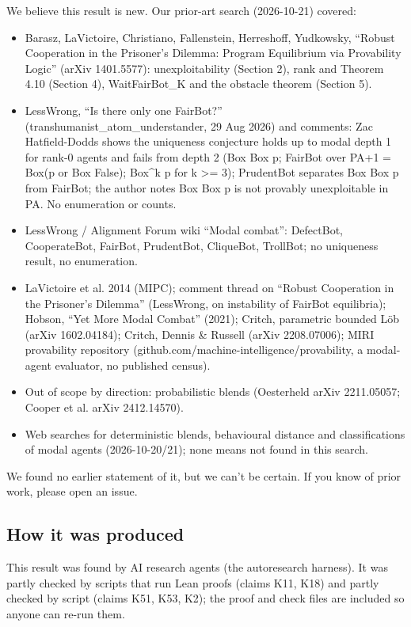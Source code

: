 \documentclass{article}
\begin{document}
We believe this result is new. Our prior-art search (2026-10-21) covered:

\begin{itemize}
\item Barasz, LaVictoire, Christiano, Fallenstein, Herreshoff, Yudkowsky, ``Robust Cooperation in the Prisoner's Dilemma: Program Equilibrium via Provability Logic'' (arXiv 1401.5577): unexploitability (Section 2), rank and Theorem 4.10 (Section 4), WaitFairBot\_K and the obstacle theorem (Section 5).
\item LessWrong, ``Is there only one FairBot?'' (transhumanist\_atom\_understander, 29 Aug 2026) and comments: Zac Hatfield-Dodds shows the uniqueness conjecture holds up to modal depth 1 for rank-0 agents and fails from depth 2 (Box Box p; FairBot over PA+1 = Box(p or Box False); Box\textasciicircum{}k p for k \textgreater{}= 3); PrudentBot separates Box Box p from FairBot; the author notes Box Box p is not provably unexploitable in PA. No enumeration or counts.
\item LessWrong / Alignment Forum wiki ``Modal combat'': DefectBot, CooperateBot, FairBot, PrudentBot, CliqueBot, TrollBot; no uniqueness result, no enumeration.
\item LaVictoire et al. 2014 (MIPC); comment thread on ``Robust Cooperation in the Prisoner's Dilemma'' (LessWrong, on instability of FairBot equilibria); Hobson, ``Yet More Modal Combat'' (2021); Critch, parametric bounded Löb (arXiv 1602.04184); Critch, Dennis \& Russell (arXiv 2208.07006); MIRI provability repository (github.com/machine-intelligence/provability, a modal-agent evaluator, no published census).
\item Out of scope by direction: probabilistic blends (Oesterheld arXiv 2211.05057; Cooper et al. arXiv 2412.14570).
\item Web searches for deterministic blends, behavioural distance and classifications of modal agents (2026-10-20/21); none means not found in this search.
\end{itemize}

We found no earlier statement of it, but we can't be certain. If you know of prior work, please open an issue.

\subsection*{How it was produced}

This result was found by AI research agents (the autoresearch harness). It was partly checked by scripts that run Lean proofs (claims K11, K18) and partly checked by script (claims K51, K53, K2); the proof and check files are included so anyone can re-run them.
\end{document}
